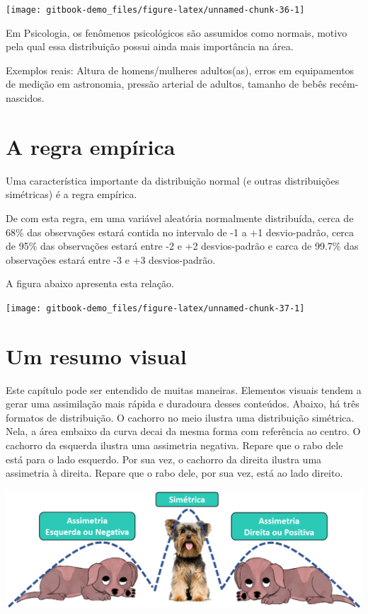 \documentclass[
]{book}
\begin{document}
\begin{center}\texttt{[image: gitbook-demo\_files/figure-latex/unnamed-chunk-36-1]} \end{center}

Em Psicologia, os fenômenos psicológicos são assumidos como normais, motivo pela qual essa distribuição possui ainda mais importância na área.

Exemplos reais: Altura de homens/mulheres adultos(as), erros em equipamentos de medição em astronomia, pressão arterial de adultos, tamanho de bebês recém-nascidos.

\hypertarget{a-regra-empuxedrica}{%
\section{A regra empírica}\label{a-regra-empuxedrica}}

Uma característica importante da distribuição normal (e outras distribuições simétricas) é a regra empírica.

De com esta regra, em uma variável aleatória normalmente distribuída, cerca de 68\% das observações estará contida no intervalo de -1 a +1 desvio-padrão, cerca de 95\% das observações estará entre -2 e +2 desvios-padrão e carca de 99.7\% das observações estará entre -3 e +3 desvios-padrão.

A figura abaixo apresenta esta relação.

\begin{center}\texttt{[image: gitbook-demo\_files/figure-latex/unnamed-chunk-37-1]} \end{center}

\hypertarget{um-resumo-visual}{%
\section{Um resumo visual}\label{um-resumo-visual}}

Este capítulo pode ser entendido de muitas maneiras. Elementos visuais tendem a gerar uma assimilação mais rápida e duradoura desses conteúdos. Abaixo, há três formatos de distribuição. O cachorro no meio ilustra uma distribuição simétrica. Nela, a área embaixo da curva decai da mesma forma com referência ao centro. O cachorro da esquerda ilustra uma assimetria negativa. Repare que o rabo dele está para o lado esquerdo. Por sua vez, o cachorro da direita ilustra uma assimetria à direita. Repare que o rabo dele, por sua vez, está ao lado direito.

\includegraphics{./img/cap_desc_assimetria.png}
\end{document}
